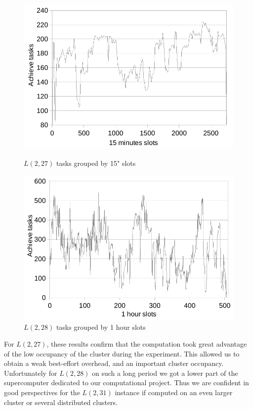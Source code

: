 \begin{figure}[htb]
\begin{minipage}[b]{0.5\linewidth}
\centering
\includegraphics[scale=.6]{figures/langford/graphe_15minutes_petit}
\caption{$L(2,27)$ tasks grouped by 15" slots}
\label{fig:graphe_15minutes_27}
\end{minipage}
\begin{minipage}[b]{0.5\linewidth}
\centering
\includegraphics[scale=.6]{figures/langford/graphe_15minutes_petit_28}
\caption{$L(2,28)$ tasks grouped by 1 hour slots}
\label{fig:graphe_15minutes_28}
\end{minipage}
\end{figure}

For $L(2,27)$, these results confirm that the computation took great advantage of the low occupancy of the cluster during the experiment. 
This allowed us to obtain a weak best-effort overhead, and an important cluster occupancy. 
Unfortunately for $L(2,28)$ on such a long period we got a lower part of the supercomputer dedicated to our computational project.
Thus we are confident in good perspectives for the $L(2,31)$ instance if computed on an even larger cluster or several distributed clusters. 

